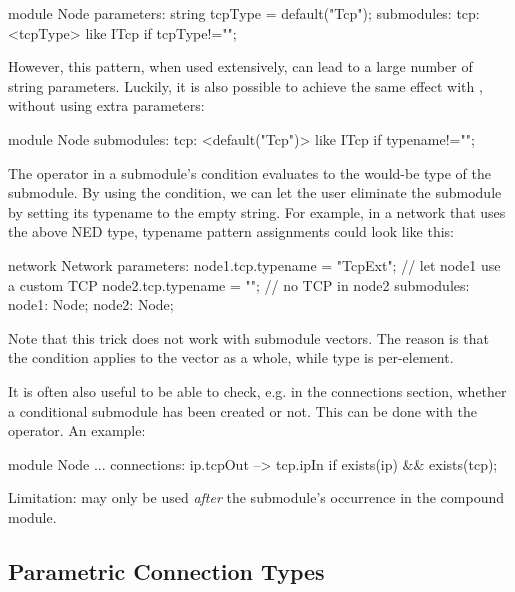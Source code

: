 \begin{ned}
module Node
{
    parameters:
        string tcpType = default("Tcp");
    submodules:
        tcp: <tcpType> like ITcp if tcpType!="";
}
\end{ned}

However, this pattern, when used extensively, can lead to a large number of
string parameters. Luckily, it is also possible to achieve the same effect
with , without using extra parameters:

\begin{ned}
module Node
{
    submodules:
        tcp: <default("Tcp")> like ITcp if typename!="";
}
\end{ned}

The  operator in a submodule's  condition
evaluates to the would-be type of the submodule. By using the 
condition, we can let the user eliminate the  submodule by setting its
typename to the empty string. For example, in a network that uses the above NED
type, typename pattern assignments could look like this:

\begin{ned}
network Network
{
    parameters:
        node1.tcp.typename = "TcpExt"; // let node1 use a custom TCP
        node2.tcp.typename = ""; // no TCP in node2
    submodules:
        node1: Node;
        node2: Node;
}
\end{ned}

Note that this trick does not work with submodule vectors. The reason is that
the condition applies to the vector as a whole, while type is per-element.

It is often also useful to be able to check, e.g. in the connections section,
whether a conditional submodule has been created or not. This can be done with
the  operator. An example:

\begin{ned}
module Node
{
        ...
    connections:
        ip.tcpOut --> tcp.ipIn if exists(ip) && exists(tcp);
}
\end{ned}

Limitation:  may only be used \textit{after} the submodule's
occurrence in the compound module.




\subsection{Parametric Connection Types}
\label{sec:ned-lang:connection-like}

